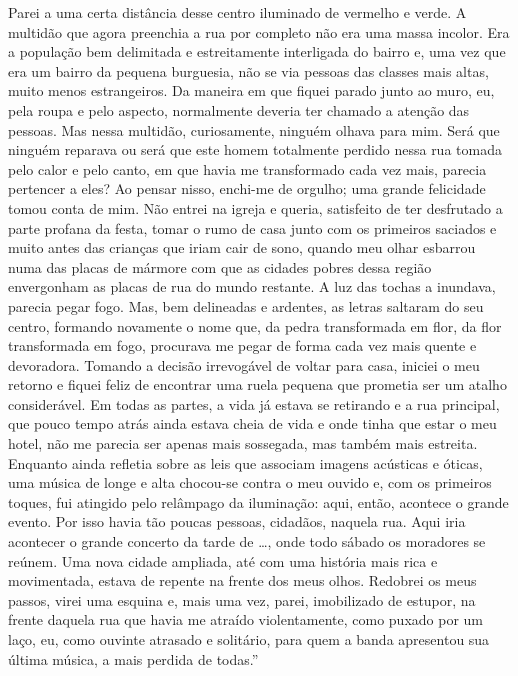 Parei a uma certa distância desse centro iluminado de vermelho e verde.
A multidão que agora preenchia a rua por completo não era uma massa
incolor. Era a população bem delimitada e estreitamente interligada do
bairro e, uma vez que era um bairro da pequena burguesia, não se via
pessoas das classes mais altas, muito menos estrangeiros. Da maneira em
que fiquei parado junto ao muro, eu, pela roupa e pelo aspecto,
normalmente deveria ter chamado a atenção das pessoas. Mas nessa
multidão, curiosamente, ninguém olhava para mim. Será que ninguém
reparava ou será que este homem totalmente perdido nessa rua tomada pelo
calor e pelo canto, em que havia me transformado cada vez mais, parecia
pertencer a eles? Ao pensar nisso, enchi-me de orgulho; uma grande
felicidade tomou conta de mim. Não entrei na igreja e queria, satisfeito
de ter desfrutado a parte profana da festa, tomar o rumo de casa junto
com os primeiros saciados e muito antes das crianças que iriam cair de
sono, quando meu olhar esbarrou numa das placas de mármore com que as
cidades pobres dessa região envergonham as placas de rua do mundo
restante. A luz das tochas a inundava, parecia pegar fogo. Mas, bem
delineadas e ardentes, as letras saltaram do seu centro, formando
novamente o nome que, da pedra transformada em flor, da flor
transformada em fogo, procurava me pegar de forma cada vez mais quente e
devoradora. Tomando a decisão irrevogável de voltar para casa, iniciei o
meu retorno e fiquei feliz de encontrar uma ruela pequena que prometia
ser um atalho considerável. Em todas as partes, a vida já estava se
retirando e a rua principal, que pouco tempo atrás ainda estava cheia de
vida e onde tinha que estar o meu hotel, não me parecia ser apenas mais
sossegada, mas também mais estreita. Enquanto ainda refletia sobre as
leis que associam imagens acústicas e óticas, uma música de
longe e alta
chocou-se contra o meu ouvido e, com os primeiros toques, fui atingido
pelo relâmpago da iluminação: aqui, então, acontece o grande evento. Por
isso havia tão poucas pessoas, cidadãos, naquela rua. Aqui iria
acontecer o grande concerto da tarde de \ldots{}, onde todo sábado os
moradores se reúnem. Uma nova cidade ampliada, até com uma história mais
rica e movimentada, estava de repente na frente dos meus olhos. Redobrei
os meus passos, virei uma esquina e, mais uma vez, parei, imobilizado de
estupor, na frente daquela rua que havia me atraído violentamente, como
puxado por um laço, eu, como ouvinte atrasado e solitário, para quem a
banda apresentou sua última música, a mais perdida de todas.''

